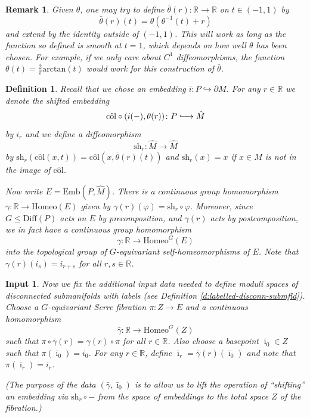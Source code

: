 \documentclass[reqno,a4paper]{article}
\numberwithin{equation}{section}
\theoremstyle{italicised}
\theoremstyle{upright}
\newtheorem{defn}[thm]{Definition}
\newtheorem{rmk}[thm]{Remark}
\newtheorem{inputdata}[thm]{Input}
\theoremstyle{italicised-restate}
\newcommand{\lhto}{\lhook\joinrel\longrightarrow}
\newcommand{\bR}{\mathbb{R}}
\renewcommand{\leq}{\leqslant}
\newcommand{\colhat}{\ensuremath{\mathrm{c}\hat{\mathrm{o}}\mathrm{l}}}
\begin{document}
\begin{rmk}
Given $\theta$, one may try to define $\bar{\theta}(r) \colon \bR \to \bR$ on $t \in (-1,1)$ by
\[
\bar{\theta}(r)(t) = \theta(\theta^{-1}(t) + r)
\]
and extend by the identity outside of $(-1,1)$. This will work as long as the function so defined is smooth at $t=1$, which depends on how well $\theta$ has been chosen. For example, if we only care about $C^1$ diffeomorphisms, the function $\theta(t) = \tfrac{2}{\pi}\mathrm{arctan}(t)$ would work for this construction of $\bar{\theta}$.
\end{rmk}

\begin{defn}\label{d:shift}
Recall that we chose an embedding $i \colon P \hookrightarrow \partial M$. For any $r \in \bR$ we denote the shifted embedding
\[
\colhat \circ (i(-),\theta(r)) \colon P \lhto \hat{M}
\]
by $i_r$ and we define a diffeomorphism
\[
\mathrm{sh}_r \colon \hat{M} \longrightarrow \hat{M}
\]
by $\mathrm{sh}_r(\colhat(x,t)) = \colhat(x,\bar{\theta}(r)(t))$ and $\mathrm{sh}_r(x) = x$ if $x \in \hat{M}$ is not in the image of $\colhat$.

Now write $E = \mathrm{Emb}(P,\hat{M})$. There is a continuous group homomorphism $\gamma \colon \bR \to \mathrm{Homeo}(E)$ given by $\gamma(r)(\varphi) = \mathrm{sh}_r \circ \varphi$. Moreover, since $G \leq \mathrm{Diff}(P)$ acts on $E$ by precomposition, and $\gamma(r)$ acts by postcomposition, we in fact have a continuous group homomorphism
\[
\gamma \colon \bR \longrightarrow \mathrm{Homeo}^G(E)
\]
into the topological group of $G$-equivariant self-homeomorphisms of $E$. Note that $\gamma(r)(i_s) = i_{r+s}$ for all $r,s \in \bR$.
\end{defn}

\begin{inputdata}\label{input-data}
Now we fix the additional input data needed to define moduli spaces of disconnected submanifolds \emph{with labels} (see Definition \ref{d:labelled-disconn-submfld}). Choose a $G$-equivariant Serre fibration $\pi \colon Z \to E$ and a continuous homomorphism
\[
\bar{\gamma} \colon \bR \longrightarrow \mathrm{Homeo}^G(Z)
\]
such that $\pi \circ \bar{\gamma}(r) = \gamma(r) \circ \pi$ for all $r \in \bR$. Also choose a basepoint $\bar{\imath}_0 \in Z$ such that $\pi(\bar{\imath}_0) = i_0$. For any $r \in \bR$, define $\bar{\imath}_r = \bar{\gamma}(r)(\bar{\imath}_0)$ and note that $\pi(\bar{\imath}_r) = i_r$.

(The purpose of the data $(\bar{\gamma},\bar{\imath}_0)$ is to allow us to lift the operation of ``shifting'' an embedding via $\mathrm{sh}_r \circ -$ from the space of embeddings to the total space $Z$ of the fibration.)
\end{inputdata}
\end{document}
